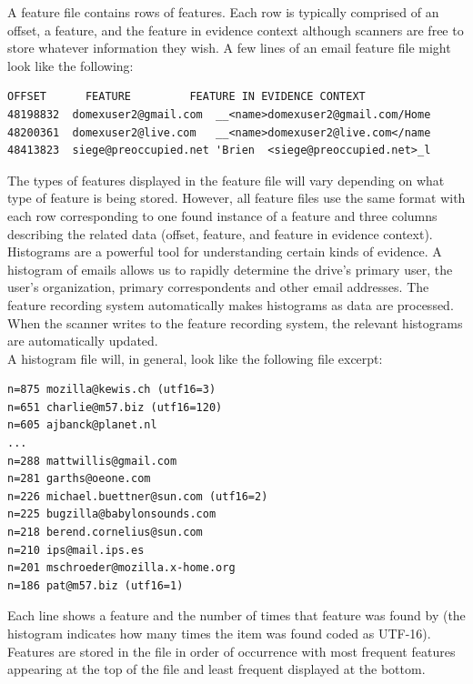 \documentclass[11pt]{article} %
\begin{document}
A feature file contains rows of features. Each row is typically comprised of an offset, a feature, and the feature in evidence context although scanners are free to store whatever information they wish. A few lines of an email feature file might look like the following:\\ 
\lstset{style=customfile}
\begin{lstlisting}
OFFSET      FEATURE	        FEATURE IN EVIDENCE CONTEXT
48198832  domexuser2@gmail.com 	__<name>domexuser2@gmail.com/Home
48200361  domexuser2@live.com 	__<name>domexuser2@live.com</name
48413823  siege@preoccupied.net	'Brien  <siege@preoccupied.net>_l
\end{lstlisting}

The types of features displayed in the feature file will vary depending on what type of feature is being stored. However, all feature files use the same format with each row corresponding to one found instance of a feature and three columns describing the related data (offset, feature, and feature in evidence context). \\

Histograms are a powerful tool for understanding certain kinds of evidence. A histogram of emails allows us to rapidly determine the drive's primary user, the user's organization, primary correspondents and other email addresses. The feature recording system automatically makes histograms as data are processed. When the scanner writes to the feature recording system, the relevant histograms are automatically updated. \\ 

A histogram file will, in general, look like the following file excerpt:
\lstset{style=customfile}
\begin{lstlisting}
n=875 mozilla@kewis.ch (utf16=3)
n=651 charlie@m57.biz (utf16=120)
n=605 ajbanck@planet.nl
...
n=288 mattwillis@gmail.com
n=281 garths@oeone.com
n=226 michael.buettner@sun.com (utf16=2)
n=225 bugzilla@babylonsounds.com
n=218 berend.cornelius@sun.com
n=210 ips@mail.ips.es
n=201 mschroeder@mozilla.x-home.org
n=186 pat@m57.biz (utf16=1)
\end{lstlisting}
Each line shows a feature and the number of times that feature was found by \bulk (the histogram indicates how many times the item was found coded as UTF-16). Features are stored in the file in order of occurrence with most frequent features appearing at the top of the file and least frequent displayed at the bottom. \\
\end{document}
